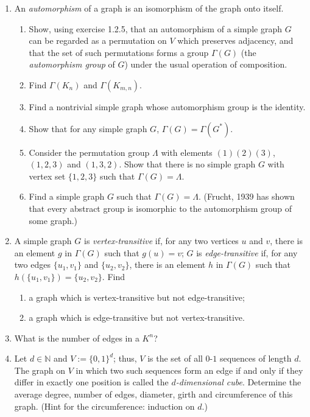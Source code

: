 \documentclass{article}
\theoremstyle{remark}
\begin{document}
\begin{enumerate}
        \item An \emph{automorphism} of a graph is an isomorphism of the graph onto itself.
        \begin{enumerate}
            \item Show, using exercise 1.2.5, that an automorphism of a simple graph \(G\) can be regarded as a permutation on \(V\) which preserves adjacency, and that the set of such permutations forms a group \(\Gamma(G)\) (the \emph{automorphism group} of \(G\)) under the usual operation of composition.
            \item Find \(\Gamma(K_{n})\) and \(\Gamma(K_{m,n})\).
            \item Find a nontrivial simple graph whose automorphism group is the identity.
            \item Show that for any simple graph \(G\), \(\Gamma(G) = \Gamma(G^{*})\).
            \item Consider the permutation group \(\Lambda\) with elements \((1)(2)(3)\), \((1,2,3)\) and \((1,3,2)\). Show that there is no simple graph \(G\) with vertex set \(\{1,2,3\}\) such that \(\Gamma(G) = \Lambda\).
            \item Find a simple graph \(G\) such that \(\Gamma(G) = \Lambda\). (Frucht, 1939 has shown that every abstract group is isomorphic to the automorphism group of some graph.)
        \end{enumerate}
    
        \item A simple graph \(G\) is \emph{vertex-transitive} if, for any two vertices \(u\) and \(v\), there is an element \(g\) in \(\Gamma(G)\) such that \(g(u) = v\); \(G\) is \emph{edge-transitive} if, for any two edges \(\{u_1, v_1\}\) and \(\{u_2, v_2\}\), there is an element \(h\) in \(\Gamma(G)\) such that \(h(\{u_1, v_1\}) = \{u_2, v_2\}\). Find
        \begin{enumerate}
            \item a graph which is vertex-transitive but not edge-transitive;
            \item a graph which is edge-transitive but not vertex-transitive.
        \end{enumerate}

            \item What is the number of edges in a \(K^{n}\)?
        
            \item Let \(d \in \mathbb{N}\) and \(V := \{0,1\}^{d}\); thus, \(V\) is the set of all \(0\)-\(1\) sequences of length \(d\). The graph on \(V\) in which two such sequences form an edge if and only if they differ in exactly one position is called the \emph{\(d\)-dimensional cube}. Determine the average degree, number of edges, diameter, girth and circumference of this graph. (Hint for the circumference: induction on \(d\).)
        

\end{enumerate}
\end{document}
